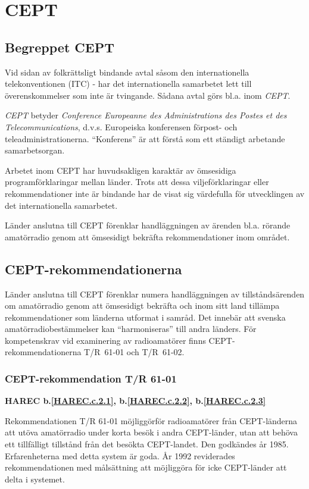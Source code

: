 \section{CEPT}

\subsection{Begreppet CEPT}

Vid sidan av folkrättsligt bindande avtal såsom den internationella
telekonventionen (ITC) - har det internationella samarbetet lett till
överenskommelser som inte är tvingande. Sådana avtal görs bl.a. inom
\emph{CEPT}.

\emph{CEPT} betyder \emph{Conference Europeanne des Administrations
  des Postes et des Telecommunications}, d.v.s. Europeiska konferensen
förpost- och teleadministrationerna. ``Konferens'' är att förstå som
ett ständigt arbetande samarbetsorgan.

Arbetet inom CEPT har huvudsakligen karaktär av ömsesidiga
programförklaringar mellan länder. Trots att dessa viljeförklaringar
eller rekommendationer inte är bindande har de visat sig värdefulla
för utvecklingen av det internationella samarbetet.

Länder anslutna till CEPT förenklar handläggningen av ärenden
bl.a. rörande amatörradio genom att ömsesidigt bekräfta
rekommendationer inom området.

\subsection{CEPT-rekommendationerna}

Länder anslutna till CEPT förenklar numera handläggningen av
tillståndsärenden om amatörradio genom att ömsesidigt bekräfta och
inom sitt land tillämpa rekommendationer som länderna utformat i
samråd. Det innebär att svenska amatörradiobestämmelser kan
``harmoniseras'' till andra länders.  För kompetenskrav vid
examinering av radioamatörer finns CEPT-rekommendationerna T/R~61-01
och T/R~61-02.

\subsubsection{CEPT-rekommendation T/R 61-01}
\textbf{
HAREC b.\ref{HAREC.c.2.1}\label{myHAREC.c.2.1},
 b.\ref{HAREC.c.2.2}\label{myHAREC.c.2.2},
 b.\ref{HAREC.c.2.3}\label{myHAREC.c.2.3}
}

Rekommendationen T/R 61-01 möjliggörför radioamatörer från
CEPT-länderna att utöva amatörradio under korta besök i andra
CEPT-länder, utan att behöva ett tillfälligt tillstånd från det besökta
CEPT-landet. Den godkändes år 1985. Erfarenheterna med detta system är
goda. År 1992 reviderades rekommendationen med målsättning att
möjliggöra för icke CEPT-länder att delta i systemet.

